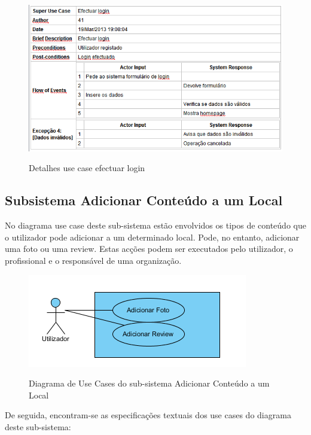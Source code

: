 ﻿\documentclass[12pt,a4paper]{article}
\begin{document}
\clearpage
\newpage

\begin{figure}[h!]
\centering
\includegraphics[scale=0.7]{d_usecase/login}
\label{usecase}
\caption{Detalhes use case efectuar login}
\end{figure}


\subsection{Subsistema Adicionar Conteúdo a um Local}
No diagrama use case deste sub-sistema estão envolvidos os tipos de conteúdo que o utilizador pode adicionar a um determinado local. Pode, no entanto, adicionar uma foto ou uma review. Estas acções podem ser executados pelo utilizador, o profissional e o responsável de uma organização.\\

\begin{figure}[h!]
\centering
\includegraphics[scale=1]{usecase/U_AdicionarConteudo}
\label{usecase}
\caption{Diagrama de Use Cases do sub-sistema Adicionar Conteúdo a um Local}
\end{figure}

De seguida, encontram-se as especificações textuais dos use cases do diagrama deste sub-sistema:\\
\end{document}
